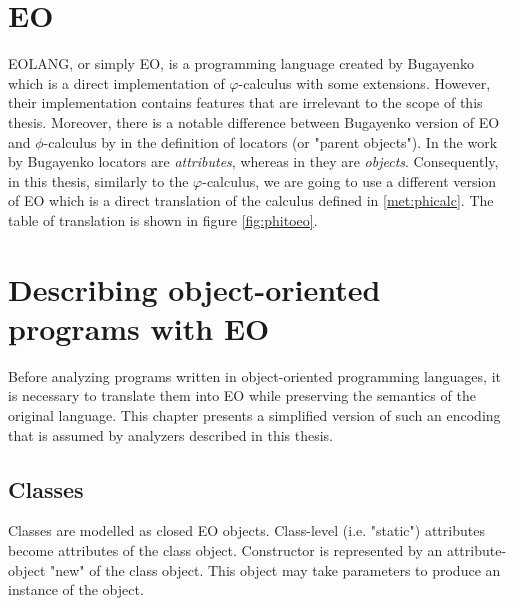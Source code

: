


\section{EO}
\label{met:eo}
EOLANG, or simply EO, is a programming language created by Bugayenko \cite{eolang} which is a direct implementation of $\varphi$-calculus with some extensions. However, their implementation contains features that are irrelevant to the scope of this thesis. Moreover, there is a notable difference between Bugayenko version of EO and $\phi$-calculus by \cite{kudasov} in the definition of locators (or "parent objects"). In the work by Bugayenko locators are \textit{attributes}, whereas in \cite{kudasov} they are \textit{objects}. Consequently, in this thesis, similarly to the $\varphi$-calculus, we are going to use a different version of EO which is a direct translation of the calculus defined in \ref{met:phicalc}. The table of translation is shown in figure \ref{fig:phitoeo}.



\section{Describing object-oriented programs with EO}
\label{met:encoding}
Before analyzing programs written in object-oriented programming languages, it is necessary to translate them into EO while preserving the semantics of the original language. This chapter presents a simplified version of such an encoding that is assumed by analyzers described in this thesis.

\subsection{Classes}
Classes are modelled as closed EO objects. Class-level (i.e. "static") attributes become attributes of the class object. Constructor is represented by an attribute-object "new" of the class object. This object may take parameters to produce an instance of the object.


